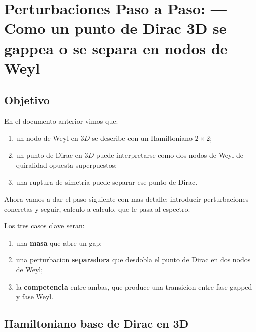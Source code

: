 \chapter{Perturbaciones Paso a Paso: --- Como un punto de Dirac 3D se gappea o se separa en nodos de Weyl}
\label{ch:perturbaciones-dirac-weyl-3d}







\section{Objetivo}

En el documento anterior vimos que:

\begin{enumerate}[leftmargin=*]
  \item un nodo de Weyl en \(3D\) se describe con un Hamiltoniano \(2\times 2\);
  \item un punto de Dirac en \(3D\) puede interpretarse como dos nodos de Weyl de quiralidad opuesta superpuestos;
  \item una ruptura de simetria puede separar ese punto de Dirac.
\end{enumerate}

Ahora vamos a dar el paso siguiente con mas detalle: introducir perturbaciones concretas y seguir, calculo a calculo, que le pasa al espectro.

Los tres casos clave seran:

\begin{enumerate}[leftmargin=*]
  \item una \textbf{masa} que abre un gap;
  \item una perturbacion \textbf{separadora} que desdobla el punto de Dirac en dos nodos de Weyl;
  \item la \textbf{competencia} entre ambas, que produce una transicion entre fase gapped y fase Weyl.
\end{enumerate}

\section{Hamiltoniano base de Dirac en 3D}

